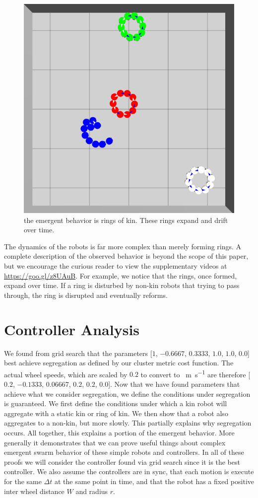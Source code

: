 \documentclass[conference]{IEEEtran}
\begin{document}
    \begin{figure}
      \centering
      \includegraphics[width=0.7\linewidth]{./images/rings_example.png}
      \caption{the emergent behavior is rings of kin. These rings expand and drift over time.}
      \label{fig:rings}
    \end{figure}

    The dynamics of the robots is far more complex than merely forming rings. A complete description of the observed behavior is beyond the scope of this paper, but we encourage the curious reader to view the supplementary videos at \href{https://www.youtube.com/playlist?list=PL9HqYJ1IkIKVX9EsT5BY9LnBsBPTjc5bB}{https://goo.gl/z8UAuB}. For example, we notice that the rings, once formed, expand over time. If a ring is disturbed by non-kin robots that trying to pass through, the ring is disrupted and eventually reforms.

\section{Controller Analysis}

  We found from grid search that the parameters [$1$, $-0.6667$, $0.3333$, $1.0$, $1.0$, $0.0$] best achieve segregation as defined by our cluster metric cost function. The actual wheel speeds, which are scaled by $0.2$ to convert to \SI{}{\meter\per\second} are therefore [$0.2$, $-0.1333$, $0.06667$, $0.2$, $0.2$, $0.0$]. Now that we have found parameters that achieve what we consider segregation, we define the conditions under segregation is guaranteed. We first define the conditions under which a kin robot will aggregate with a static kin or ring of kin. We then show that a robot also aggregates to a non-kin, but more slowly. This partially explains why segregation occurs. All together, this explains a portion of the emergent behavior. More generally it demonstrates that we can prove useful things about complex emergent swarm behavior of these simple robots and controllers. In all of these proofs we will consider the controller found via grid search since it is the best controller. We also assume the controllers are in sync, that each motion is execute for the same $\Delta t$ at the same point in time, and that the robot has a fixed positive inter wheel distance $W$ and radius $r$.
\end{document}
